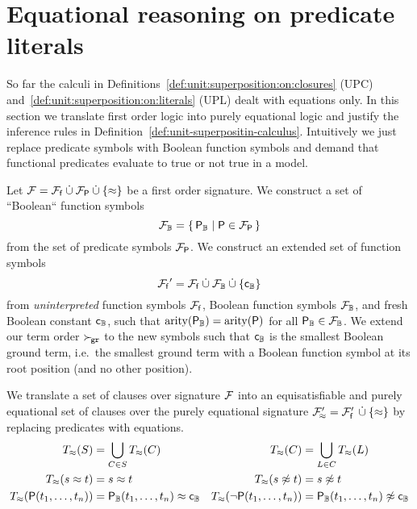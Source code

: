     \section{Equational reasoning on predicate literals}\label{sec:equational:reasoning:on:predicates}

    So far the calculi in Definitions~\ref{def:unit:superposition:on:closures} (UPC)
    and~\ref{def:unit:superposition:on:literals} (UPL) dealt
    with equations only.
    In this section we translate first order logic
    into purely equational logic and
    justify the inference rules in Definition~\vref{def:unit-superpositin-calculus}.
    Intuitively we just replace predicate symbols with Boolean function symbols
    and demand that functional predicates evaluate to true or not true in a model.

    \begin{definition}
        Let \( \mathcal{F} = {\mathcal{F}_{\mathsf{f}}} \mathbin{\dot\cup} {\mathcal{F}_{\mathsf{P}}} \mathbin{\dot\cup} \{\approx \} \) be a first order signature.
        We construct a set of “Boolean“ function symbols
        \[
            {\mathcal{F}}_{\mathbb{B}} = \{ \, {\mathsf{P}}_{\mathbb{B}} \mid \mathsf{P} \in {\mathcal{F}_{\mathsf{P}}} \, \}
        \]
        from the set of predicate symbols \( {\mathcal{F}_{\mathsf{P}}} \).
        We construct an extended set of function symbols
        \[
            {\mathcal{F}_{\mathsf{f}}}' = {\mathcal{F}_{\mathsf{f}}}
            \mathbin{\dot\cup}
            {\mathcal{F}}_{\mathbb{B}}
 \mathbin{\dot\cup}
            \{ {\mathsf{c}}_{\mathbb{B}}
            \}
            \]
        from \emph{uninterpreted} function symbols \( {\mathcal{F}_{\mathsf{f}}} \),
        Boolean function symbols \( {\mathcal{F}}_{\mathbb{B}} \),
        and fresh Boolean constant \( {\mathsf{c}}_{\mathbb{B}} \),
        such that \( \operatorname{arity}({\mathsf{P}}_{\mathbb{B}}) = \operatorname{arity}(\mathsf{P}) \) for all \( {\mathsf{P}}_{\mathbb{B}}\in{\mathcal{F}}_{\mathbb{B}} \).
        We extend our term order \( \mathrel\succ_{\!\mathtt{gr}} \) to the new symbols
        such that \( {\mathsf{c}}_{\mathbb{B}} \) is the smallest Boolean ground term,
        i.e.~the smallest ground term with a Boolean function symbol
        at its root position (and no other position).
    \end{definition}

    \begin{definition}
        We translate a set of clauses over signature \( \mathcal{F} \)
        into an equisatisfiable and purely equational set of clauses
        over the purely equational signature
        \( {\mathcal{F}'_{\!\approx}} = {\mathcal{F}'_{\mathsf{f}}}
        \, \mathbin{\dot\cup}  \{ \approx \} \)
        by replacing predicates with equations.
        \begin{align*}
            T_\approx(S) &= \bigcup_{C\in S} T_\approx(C) &
            T_\approx(C) &= \bigcup_{L\in C} T_\approx(L) \\
            T_\approx(s\approx t) &= s\approx t &
            T_\approx(s\not\approx t) &= s\not\approx t \\
            T_\approx(\mathsf{P}(t_1,\ldots,t_n)) &= {\mathsf{P}}_{\mathbb{B}}(t_1,\ldots,t_n)\approx{\mathsf{c}}_{\mathbb{B}} &
            T_\approx(\lnot\mathsf{P}(t_1,\ldots,t_n)) &= {\mathsf{P}}_{\mathbb{B}}(t_1,\ldots,t_n)\not\approx{\mathsf{c}}_{\mathbb{B}}
        \end{align*}
    \end{definition}

